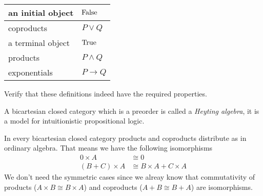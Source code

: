 \begin{tabular}{|l|l|}
\hline
an initial object & $\mathrm{False}$ \\\hline
coproducts & $P \vee Q$ \\ \hline
a terminal object & $\mathrm{True}$ \\\hline
products & $P \wedge Q$ \\\hline
exponentials & $P \to Q$\\\hline
\end{tabular}

\begin{Exercise}
Verify that these definitions indeed have the required properties.
\end{Exercise}
A bicartesian closed category which is a preorder is called a \emph{Heyting algebra}, it is a model for intuitionistic propositional logic.


In every bicartesian closed category products and coproducts distribute as in ordinary algebra. That means we have the following isomorphisms
\begin{align*}
  0 \times A & \cong 0 \\
  (B + C)\times A & \cong B\times A + C \times A
\end{align*}
We don't need the symmetric cases since we alreay know that commutativity of products ($A \times B \cong B \times A$) and coproducts ($A + B \cong B + A$) are isomorphisms.


